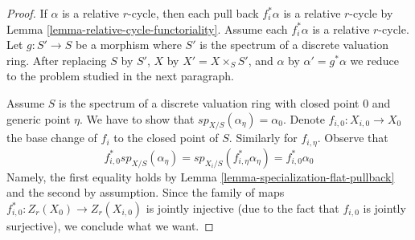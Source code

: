 \documentclass{stacks-project}
\theoremstyle{plain}
\theoremstyle{definition}
\theoremstyle{remark}
\numberwithin{equation}{subsection}
\begin{document}
\begin{proof}
If $\alpha$ is a relative $r$-cycle, then each pull back $f_i^*\alpha$ is a
relative $r$-cycle by Lemma \ref{lemma-relative-cycle-functoriality}.
Assume each $f_i^*\alpha$ is a relative $r$-cycle.
Let $g : S' \to S$ be a morphism where $S'$ is the spectrum of a discrete
valuation ring. After replacing $S$ by $S'$, $X$ by $X' = X \times_S S'$, and
$\alpha$ by $\alpha' = g^*\alpha$
we reduce to the problem studied in the next paragraph.

\medskip\noindent
Assume $S$ is the spectrum of a discrete valuation ring with closed
point $0$ and generic point $\eta$. We have to show that
$sp_{X/S}(\alpha_\eta) = \alpha_0$. Denote $f_{i, 0} : X_{i, 0} \to X_0$
the base change of $f_i$ to the closed point of $S$. Similarly
for $f_{i, \eta}$.
Observe that
$$
f_{i, 0}^*sp_{X/S}(\alpha_\eta) =
sp_{X_i/S}(f_{i, \eta}^*\alpha_\eta) = f_{i, 0}^*\alpha_0
$$
Namely, the first equality holds by
Lemma \ref{lemma-specialization-flat-pullback}
and the second by assumption. Since the family of maps
$f_{i, 0}^* : Z_r(X_0) \to Z_r(X_{i, 0})$ is jointly
injective (due to the fact that $f_{i, 0}$ is jointly
surjective), we conclude what we want.
\end{proof}
\end{document}
